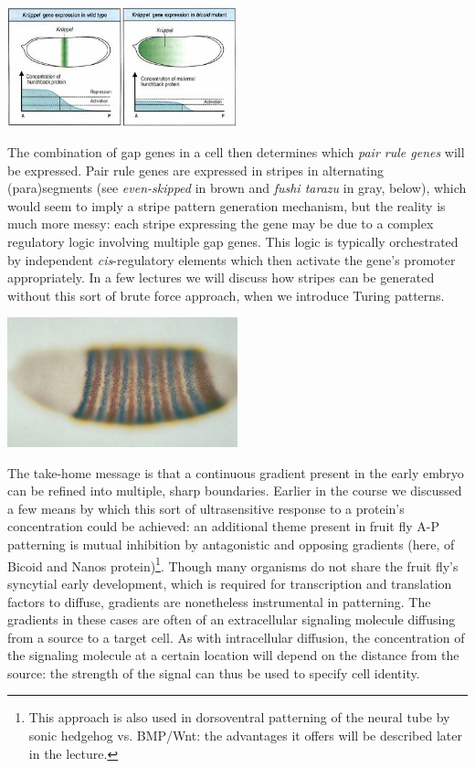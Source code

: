 \documentclass{article}
\begin{document}
\begin{center}
\includegraphics[width=0.5\textwidth]{kruppel.jpg}
\end{center}

The combination of gap genes in a cell then determines which \textit{pair rule genes} will be expressed. Pair rule genes are expressed in stripes in alternating (para)segments (see \textit{even-skipped} in brown and \textit{fushi tarazu} in gray, below), which would seem to imply a stripe pattern generation mechanism, but the reality is much more messy: each stripe expressing the gene may be due to a complex regulatory logic involving multiple gap genes. This logic is typically orchestrated by independent \textit{cis}-regulatory elements which then activate the gene's promoter appropriately. In a few lectures we will discuss how stripes can be generated without this sort of brute force approach, when we introduce Turing patterns.

\begin{center}
\includegraphics[width=0.5\textwidth]{evefushi.jpg}
\end{center}

The take-home message is that a continuous gradient present in the early embryo can be refined into multiple, sharp boundaries. Earlier in the course we discussed a few means by which this sort of ultrasensitive response to a protein's concentration could be achieved: an additional theme present in fruit fly A-P patterning is mutual inhibition by antagonistic and opposing gradients (here, of Bicoid and Nanos protein)\footnote{This approach is also used in dorsoventral patterning of the neural tube by sonic hedgehog vs. BMP/Wnt: the advantages it offers will be described later in the lecture.}. Though many organisms do not share the fruit fly's syncytial early development, which is required for transcription and translation factors to diffuse, gradients are nonetheless instrumental in patterning. The gradients in these cases are often of an extracellular signaling molecule diffusing from a source to a target cell. As with intracellular diffusion, the concentration of the signaling molecule at a certain location will depend on the distance from the source: the strength of the signal can thus be used to specify cell identity.\\
\end{document}
